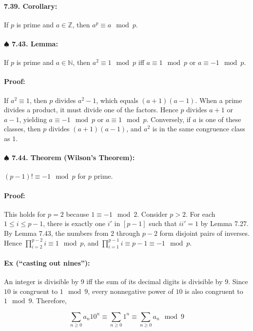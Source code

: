 \documentclass[a4paper, 11pt, twoside]{article}
\begin{document}
\paragraph{7.39. Corollary:} If $p$ is prime and $a\in\mathbb{Z}$, then $a^p\equiv a\mod p$.

\paragraph{$\spadesuit$ 7.43. Lemma:} If $p$ is prime and $a\in\mathbb{N}$, then $a^2\equiv 1\mod p$ iff $a\equiv 1\mod p$ or $a\equiv -1\mod p$.

\paragraph{Proof:} If $a^2\equiv 1$, then $p$ divides $a^2-1$, which equals $(a+1)(a-1)$. When a prime divides a product, it must divide one of the factors. Hence $p$ divides $a+1$ or $a-1$, yielding $a\equiv -1\mod p$ or $a\equiv 1\mod p$. Conversely, if $a$ is one of these classes, then $p$ divides $(a+1)(a-1)$, and $a^2$ is in the same congruence class as $1$.

\paragraph{$\spadesuit$ 7.44. Theorem (Wilson's Theorem):} $(p-1)!\equiv -1\mod p$ for $p$ prime.

\paragraph{Proof:} This holds for $p=2$ because $1\equiv -1\mod 2$. Consider $p>2$. For each $1\leq i\leq p-1$, there is exactly one $i'$ in $[p-1]$ such that $ii'=1$ by Lemma 7.27. By Lemma 7.43, the numbers from $2$ through $p-2$ form disjoint pairs of inverses. Hence $\prod^{p-2}_{i=2}i\equiv 1\mod p$, and $\prod^{p-1}_{i=1}i\equiv p-1\equiv -1\mod p$.

\paragraph{Ex (``casting out nines''):} An integer is divisible by $9$ iff the sum of its decimal digits is divisible by $9$. Since $10$ is congruent to $1\mod 9$, every nonnegative power of $10$ is also congruent to $1 \mod 9$. Therefore,

\[\sum_{n\geq 0}a_n10^n\equiv \sum_{n\geq 0}1^n\equiv \sum_{n\geq 0}a_n\mod 9\]
\end{document}
